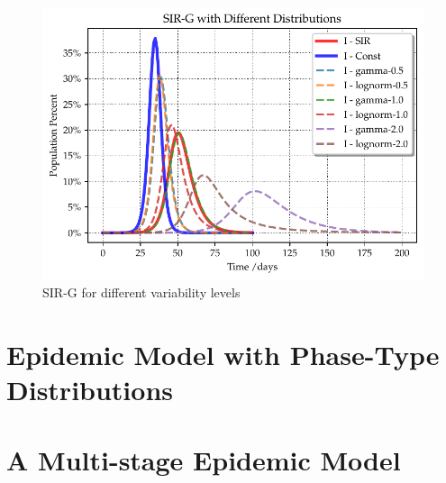 \documentclass[twoside,USenglish,10pt]{article}
\begin{document}
\begin{figure}
	\centering
	\includegraphics[width=.8\linewidth]{Variance-Analysis.pdf}
	\caption{SIR-G for different variability levels}
	\label{fig:var}
\end{figure}

\section{Epidemic Model with Phase-Type Distributions}\label{sc:PH}


\section{A Multi-stage Epidemic Model}\label{sc:multi}










\end{document}
